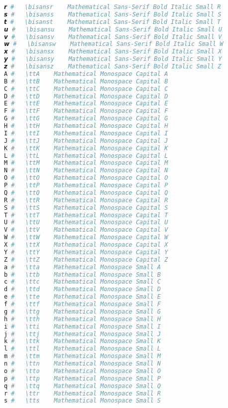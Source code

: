 \begin{lstlisting}[language=Julia]
𝙧 #   \bisansr    Mathematical Sans-Serif Bold Italic Small R
𝙨 #   \bisanss    Mathematical Sans-Serif Bold Italic Small S
𝙩 #   \bisanst    Mathematical Sans-Serif Bold Italic Small T
𝙪 #   \bisansu    Mathematical Sans-Serif Bold Italic Small U
𝙫 #   \bisansv    Mathematical Sans-Serif Bold Italic Small V
𝙬 #   \bisansw    Mathematical Sans-Serif Bold Italic Small W
𝙭 #   \bisansx    Mathematical Sans-Serif Bold Italic Small X
𝙮 #   \bisansy    Mathematical Sans-Serif Bold Italic Small Y
𝙯 #   \bisansz    Mathematical Sans-Serif Bold Italic Small Z
𝙰 #   \ttA    Mathematical Monospace Capital A
𝙱 #   \ttB    Mathematical Monospace Capital B
𝙲 #   \ttC    Mathematical Monospace Capital C
𝙳 #   \ttD    Mathematical Monospace Capital D
𝙴 #   \ttE    Mathematical Monospace Capital E
𝙵 #   \ttF    Mathematical Monospace Capital F
𝙶 #   \ttG    Mathematical Monospace Capital G
𝙷 #   \ttH    Mathematical Monospace Capital H
𝙸 #   \ttI    Mathematical Monospace Capital I
𝙹 #   \ttJ    Mathematical Monospace Capital J
𝙺 #   \ttK    Mathematical Monospace Capital K
𝙻 #   \ttL    Mathematical Monospace Capital L
𝙼 #   \ttM    Mathematical Monospace Capital M
𝙽 #   \ttN    Mathematical Monospace Capital N
𝙾 #   \ttO    Mathematical Monospace Capital O
𝙿 #   \ttP    Mathematical Monospace Capital P
𝚀 #   \ttQ    Mathematical Monospace Capital Q
𝚁 #   \ttR    Mathematical Monospace Capital R
𝚂 #   \ttS    Mathematical Monospace Capital S
𝚃 #   \ttT    Mathematical Monospace Capital T
𝚄 #   \ttU    Mathematical Monospace Capital U
𝚅 #   \ttV    Mathematical Monospace Capital V
𝚆 #   \ttW    Mathematical Monospace Capital W
𝚇 #   \ttX    Mathematical Monospace Capital X
𝚈 #   \ttY    Mathematical Monospace Capital Y
𝚉 #   \ttZ    Mathematical Monospace Capital Z
𝚊 #   \tta    Mathematical Monospace Small A
𝚋 #   \ttb    Mathematical Monospace Small B
𝚌 #   \ttc    Mathematical Monospace Small C
𝚍 #   \ttd    Mathematical Monospace Small D
𝚎 #   \tte    Mathematical Monospace Small E
𝚏 #   \ttf    Mathematical Monospace Small F
𝚐 #   \ttg    Mathematical Monospace Small G
𝚑 #   \tth    Mathematical Monospace Small H
𝚒 #   \tti    Mathematical Monospace Small I
𝚓 #   \ttj    Mathematical Monospace Small J
𝚔 #   \ttk    Mathematical Monospace Small K
𝚕 #   \ttl    Mathematical Monospace Small L
𝚖 #   \ttm    Mathematical Monospace Small M
𝚗 #   \ttn    Mathematical Monospace Small N
𝚘 #   \tto    Mathematical Monospace Small O
𝚙 #   \ttp    Mathematical Monospace Small P
𝚚 #   \ttq    Mathematical Monospace Small Q
𝚛 #   \ttr    Mathematical Monospace Small R
𝚜 #   \tts    Mathematical Monospace Small S

\end{lstlisting}
